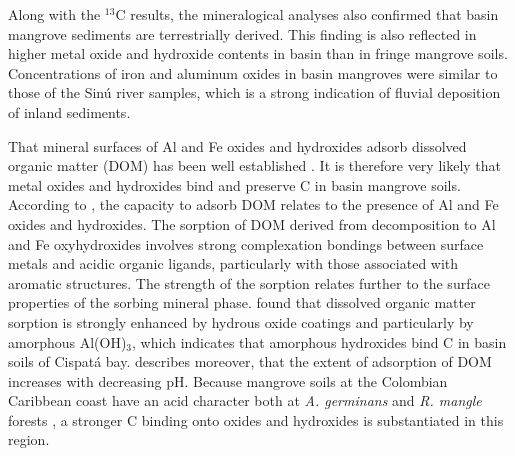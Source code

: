 Along with the $^{13}$C results, the mineralogical analyses also confirmed that basin mangrove sediments are terrestrially derived. This finding is also reflected in higher metal oxide and hydroxide contents in basin than in fringe mangrove soils. Concentrations of iron and aluminum oxides in basin mangroves were similar to those of the Sin\'{u} river samples, which is a strong indication of fluvial deposition of inland sediments. 


That mineral surfaces of Al and Fe oxides and hydroxides adsorb dissolved organic matter (DOM) has been well established \citep{tipping1981, Oades1988, kaiser2000, Mikutta2006}. It is therefore very likely that metal oxides and hydroxides bind and preserve C in basin mangrove soils. According to \citet{kaiser2000}, the capacity to adsorb DOM relates to the presence of Al and Fe oxides and hydroxides. The sorption of DOM derived from decomposition to Al and Fe oxyhydroxides involves strong complexation bondings between surface metals and acidic organic ligands, particularly with those associated with aromatic structures. The strength of the sorption relates further to the surface properties of the sorbing mineral phase. \citet{kaiser2000} found that dissolved organic matter sorption is strongly enhanced by hydrous oxide coatings and particularly by amorphous Al(OH)$_3$, which indicates that amorphous hydroxides bind C in basin soils of Cispat\'{a} bay. \citet{tipping1981} describes moreover, that the extent of adsorption of DOM increases with decreasing pH. Because mangrove soils at the Colombian Caribbean coast have an acid character both at \textit {A. germinans} and \textit {R. mangle} forests \citep{urrego2014}, a stronger C binding onto oxides and hydroxides is substantiated in this region. 

